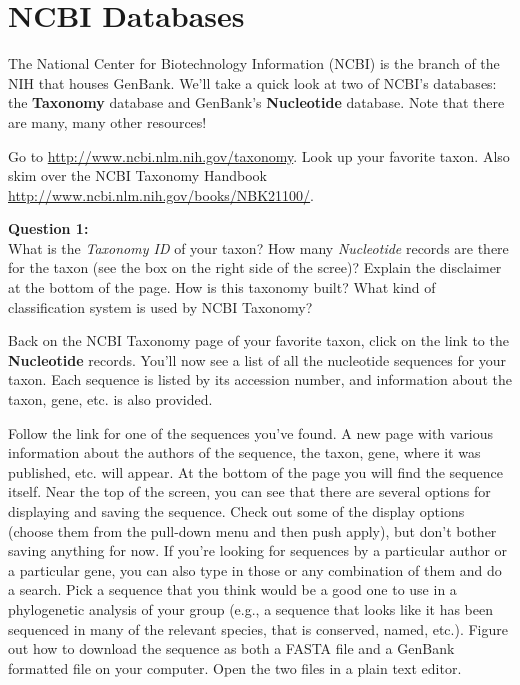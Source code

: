 \documentclass[11pt]{article}
\begin{document}
\section{NCBI Databases}


The National Center for Biotechnology Information (NCBI) is the branch of the NIH
that houses GenBank. We'll take a quick look at two of NCBI's databases:
the \textbf{Taxonomy} database and GenBank's \textbf{Nucleotide} database.
Note that there are many, many other resources!

Go to \url{http://www.ncbi.nlm.nih.gov/taxonomy}. 
Look up your favorite taxon.
Also skim over the NCBI Taxonomy Handbook
\url{http://www.ncbi.nlm.nih.gov/books/NBK21100/}.

\begin{framed}
\noindent
\textbf{Question 1:} \\
What is the \textit{Taxonomy ID} of your taxon? 
How many \textit{Nucleotide} records are there for the taxon (see the box on the right side of the scree)?
Explain the disclaimer at the bottom of the page.
How is this taxonomy built?
What kind of classification system is used by NCBI Taxonomy?
\end{framed}

Back on the NCBI Taxonomy page of your favorite taxon, click
on the link to the \textbf{Nucleotide} records.
You'll now see a list of all the nucleotide sequences
for your taxon.
Each sequence is listed by its accession number, and information about the taxon, gene, etc. is also provided. 

Follow the link for one of the sequences you've found. 
A new page with various information about the authors of the sequence, the taxon, gene, where it was published, etc. will appear. 
At the bottom of the page you will find the sequence itself. 
Near the top of the screen, you can see that there are several options for displaying and saving the sequence. 
Check out some of the display options (choose them from the pull-down menu and then push apply), but don't bother saving anything for now. 
If you're looking for sequences by a particular author or a particular gene, 
you can also type in those or any combination of them and do a search. 
Pick a sequence that you think would be a good one to use in a phylogenetic analysis of your group 
(e.g., a sequence that looks like it has been sequenced in many of the relevant species, that is conserved, named, etc.).
Figure out how to download the sequence as both a FASTA file and a GenBank formatted file on your computer.
Open the two files in a plain text editor.
\end{document}
